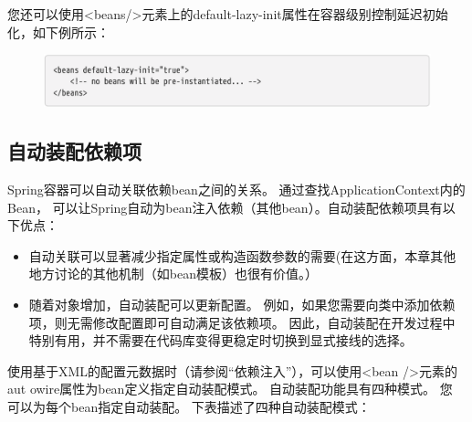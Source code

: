 您还可以使用<beans/>元素上的default-lazy-init属性在容器级别控制延迟初始化，如下例所示：

\begin{figure}[ht]
    \centering
    \includegraphics[width=1\linewidth]{./Figure/58.png}
\end{figure}

\subsection{自动装配依赖项}
Spring容器可以自动关联依赖bean之间的关系。
通过查找ApplicationContext内的Bean，
可以让Spring自动为bean注入依赖（其他bean）。自动装配依赖项具有以下优点：


\begin{itemize}
    \item 自动关联可以显著减少指定属性或构造函数参数的需要(在这方面，本章其他地方讨论的其他机制（如bean模板）也很有价值。）
    \item 随着对象增加，自动装配可以更新配置。
     例如，如果您需要向类中添加依赖项，则无需修改配置即可自动满足该依赖项。 
     因此，自动装配在开发过程中特别有用，并不需要在代码库变得更稳定时切换到显式接线的选择。
\end{itemize}

使用基于XML的配置元数据时（请参阅“依赖注入”），可以使用<bean />元素的aut
owire属性为bean定义指定自动装配模式。 自动装配功能具有四种模式。 您
可以为每个bean指定自动装配。 下表描述了四种自动装配模式：









